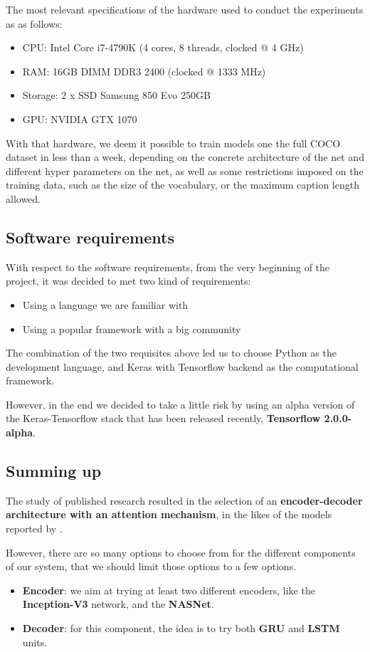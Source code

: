 The most relevant specifications of the hardware used to conduct the experiments as as follows:

\begin{itemize}
\item CPU: Intel Core i7-4790K (4 cores, 8 threads, clocked @ 4 GHz)
\item RAM: 16GB DIMM DDR3 2400 (clocked @ 1333 MHz)
\item Storage: 2 x SSD Samsung 850 Evo 250GB
\item GPU: NVIDIA GTX 1070
\end{itemize}

With that hardware, we deem it possible to train models one the full COCO dataset in less than a week, depending on the concrete architecture of the net and different hyper parameters on the net, as well as some restrictions imposed on the training data, such as the size of the vocabulary, or the maximum caption length allowed.

\subsection{Software requirements}

With respect to the software requirements, from the very beginning of the project, it was decided to met two kind of requirements:
\begin{itemize}
    \item Using a language we are familiar with
    \item Using a popular framework with a big community 
\end{itemize}

The combination of the two requisites above led us to choose Python as the development language, and Keras with Tensorflow backend as the computational framework. 

However, in the end we decided to take a little risk by using an alpha version of the Keras-Tensorflow stack that has been released recently, \textbf{Tensorflow 2.0.0-alpha}.

\subsection{Summing up}

The study of published research resulted in the selection of an \textbf{encoder-decoder architecture with an attention mechanism}, in the likes of the models reported by \citet{Xu2015}. 

However, there are so many options to choose from for the different components of our system, that we should limit those options to a few options.
\begin{itemize}
    \item \textbf{Encoder}: we aim at trying at least two different encoders, like the \textbf{Inception-V3} network, and the \textbf{NASNet}.
    \item \textbf{Decoder}: for this component, the idea is to try both \textbf{GRU} and \textbf{LSTM} units. 
\end{itemize}

